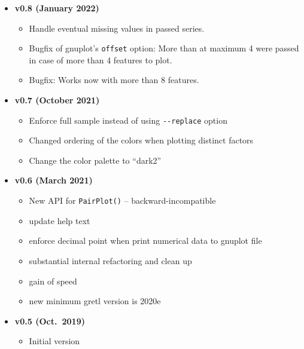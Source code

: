 \documentclass{article}
\newcommand{\tightlist}{}
\begin{document}
\begin{itemize}
  \begin{itemize}
  \tightlist
  \item
    Fix bug with \texttt{const} inheritance: its illegal for a function
    which receives an argument A that is declared as const to pass A on
    in pointer form to another function which does not promise to treat
    it as \texttt{const}.
  \end{itemize}
\item
  \textbf{v0.8 (January 2022)}

  \begin{itemize}
  \tightlist
  \item
    Handle eventual missing values in passed series.
  \item
    Bugfix of gnuplot's \texttt{offset} option: More than at maximum 4
    were passed in case of more than 4 features to plot.
  \item
    Bugfix: Works now with more than 8 features.
  \end{itemize}
\item
  \textbf{v0.7 (October 2021)}

  \begin{itemize}
  \tightlist
  \item
    Enforce full sample instead of using \texttt{-\/-replace} option
  \item
    Changed ordering of the colors when plotting distinct factors
  \item
    Change the color palette to ``dark2''
  \end{itemize}
\item
  \textbf{v0.6 (March 2021)}

  \begin{itemize}
  \tightlist
  \item
    New API for \texttt{PairPlot()} -- backward-incompatible
  \item
    update help text
  \item
    enforce decimal point when print numerical data to gnuplot file
  \item
    substantial internal refactoring and clean up
  \item
    gain of speed
  \item
    new minimum gretl version is 2020e
  \end{itemize}
\item
  \textbf{v0.5 (Oct.~2019)}

  \begin{itemize}
  \tightlist
  \item
    Initial version
  \end{itemize}
\end{itemize}
\end{document}
